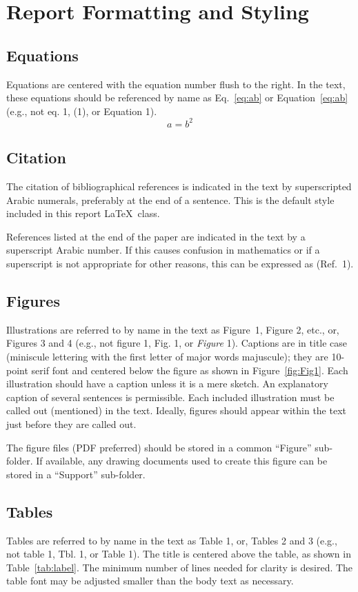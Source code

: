 \documentclass[]{BasiliskReportMemo}
\begin{document}
\section{Report Formatting and Styling}
\subsection{Equations}
Equations are centered with the equation number flush to the right. In the text, these equations should be referenced by name as Eq.~\eqref{eq:ab} or Equation~\eqref{eq:ab} (e.g., not eq.  1, (1), or Equation 1).
\begin{equation}
	\label{eq:ab}
	a = b^{2}
\end{equation}


\subsection{Citation}
The citation of bibliographical references is indicated in the text by superscripted Arabic numerals, preferably at the end of a sentence.  This is the default style included in this report \LaTeX\ class.

References listed at the end of the paper are indicated in the text by a superscript Arabic number. If this causes confusion in mathematics or if a superscript is not appropriate for other reasons, this can be expressed as (Ref.~1).  

\subsection{Figures}
Illustrations are referred to by name in the text as Figure~1, Figure 2, etc., or, Figures 3 and 4 (e.g., not figure 1, Fig. 1, or \emph{Figure} 1). Captions are in title case (miniscule lettering with the first letter of major words majuscule); they are 10-point serif font and centered below the figure as shown in Figure~\ref{fig:Fig1}. Each illustration should have a caption unless it is a mere sketch. An explanatory caption of several sentences is permissible. Each included illustration must be called out (mentioned) in the text. Ideally, figures should appear within the text just before they are called out. 

The figure files (PDF preferred) should be stored in a common ``Figure'' sub-folder.  If available, any drawing documents used to create this figure can be stored in a ``Support'' sub-folder.



\subsection{Tables}
Tables are referred to by name in the text as Table 1, or, Tables 2 and 3 (e.g., not table 1, Tbl. 1, or Table 1). The title is centered above the table, as shown in Table~\ref{tab:label}. The minimum number of lines needed for clarity is desired. The table font may be adjusted smaller than the body text as necessary.
\end{document}

